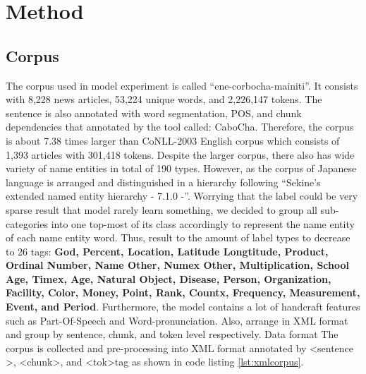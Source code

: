 \chapter{Method}

\begin{CJK*}{UTF8}{min}
\section{Corpus}
The corpus used in model experiment is called ``ene-corbocha-mainiti''.
It consists with 8,228 news articles, 53,224 unique words, and 2,226,147 tokens.
The sentence is also annotated with word segmentation, POS, and chunk dependencies that annotated by the tool called: CaboCha.
Therefore, the corpus is about 7.38 times larger than CoNLL-2003 English corpus which consists of 1,393 articles with 301,418 tokens.
Despite the larger corpus, there also has wide variety of name entities in total of 190 types.
However, as the corpus of Japanese language is arranged and distinguished in a hierarchy following ``Sekine's extended named entity hierarchy - 7.1.0 -''.
Worrying that the label could be very sparse result that model rarely learn something, we decided to group all sub-categories into one top-most of its class accordingly to represent the name entity of each name entity word.
Thus, result to the amount of label types to decrease to 26 tags: \textbf{God, Percent, Location, Latitude Longtitude, Product, Ordinal Number, Name Other, Numex Other, Multiplication, School Age, Timex, Age, Natural Object, Disease, Person, Organization, Facility, Color, Money, Point, Rank, Countx, Frequency, Measurement, Event, and Period}.
Furthermore, the model contains a lot of handcraft features such as Part-Of-Speech and Word-pronunciation.
Also, arrange in XML format and group by sentence, chunk, and token level respectively. Data format The corpus is collected and pre-processing into XML format annotated by \textless sentence \textgreater, \textless chunk\textgreater, and \textless tok\textgreater tag as shown in code listing \ref{lst:xmlcorpus}.


\end{CJK*}
